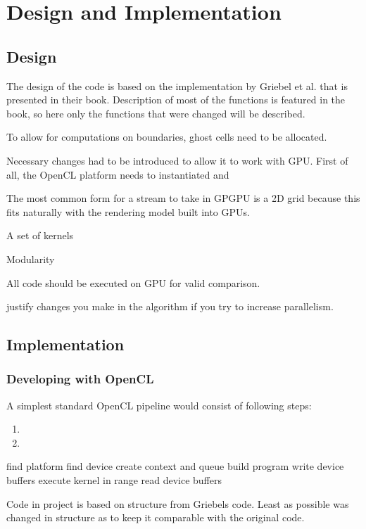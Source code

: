 \chapter{Design and Implementation}

\section{Design}
The design of the code is based on the implementation by Griebel et al. that is presented in their book\cite{griebel1998numerical}. Description of most of the functions is featured in the book, so here only the functions that were changed will be described.

To allow for computations on boundaries, ghost cells need to be allocated.


 Necessary changes had to be introduced to allow it to work with GPU. First of all, the OpenCL platform needs to instantiated and 

The most common form for a stream to take in GPGPU is a 2D grid because this fits naturally with the rendering model built into GPUs.

A set of kernels

Modularity

All code should be executed on GPU for valid comparison. 

justify changes you make
in the algorithm if you try to increase parallelism.


\section{Implementation}

\subsection{Developing with OpenCL}
A simplest standard OpenCL pipeline would consist of following steps:

\begin{enumerate}
\item 
\item
\end{enumerate}
find platform
find device
create context and queue
build program
write device buffers
execute kernel in range
read device buffers



Code in project is based on structure from Griebels code\cite{griebel1998numerical}. Least as possible was changed in structure as to keep it comparable with the original code.

